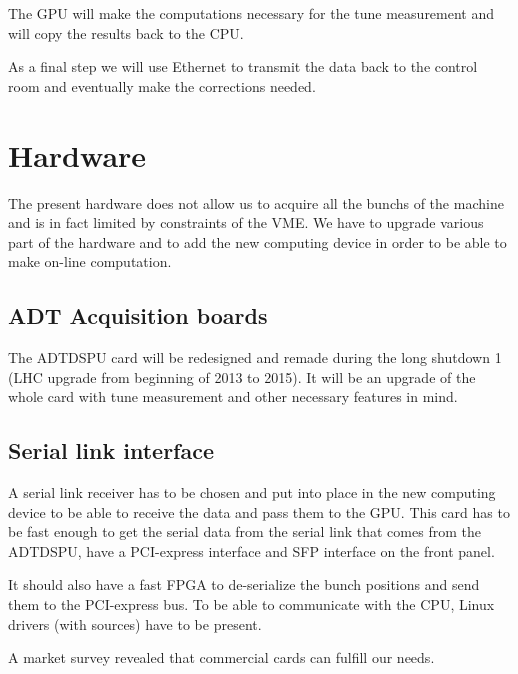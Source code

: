 The \gls{GPU} will make the computations necessary for the \gls{tune} measurement and will copy the results back to the \gls{CPU}.

As a final step we will use Ethernet to transmit the data back to the control room and eventually make the corrections needed.

\section{Hardware}

The present hardware does not allow us to acquire all the \glspl{bunch} of the machine and is in fact limited by constraints of the \gls{VME}. We have to upgrade various part of the hardware and to add the new computing device in order to be able to make on-line computation.

\subsection{ADT Acquisition boards}

The \gls{ADTDSPU} card will be redesigned and remade during the long shutdown 1 (\gls{LHC} upgrade from beginning of 2013 to 2015). It will be an upgrade of the whole card with \gls{tune} measurement and other necessary features in mind.

\subsection{Serial link interface}

A serial link receiver has to be chosen and put into place in the new computing device to be able to receive the data and pass them to the \gls{GPU}. This card has to be fast enough to get the serial data from the serial link that comes from the ADTDSPU, have a PCI-express interface and \gls{SFP} interface on the front panel. 

It should also have a fast FPGA to de-serialize the bunch positions and send them to the PCI-express bus. To be able to communicate with the CPU, Linux drivers (with sources) have to be present.

A market survey revealed that commercial cards can fulfill our needs.

